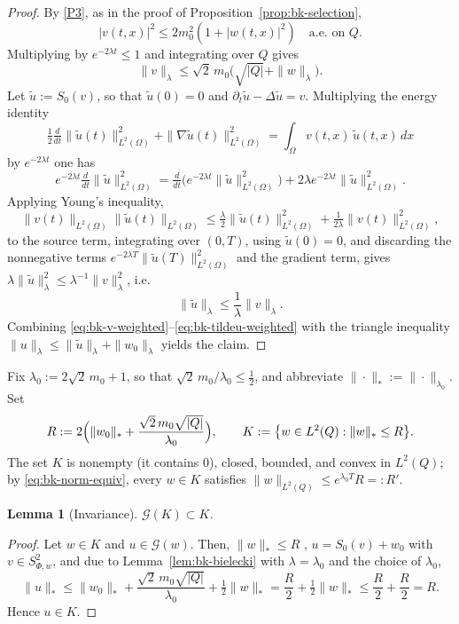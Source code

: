 \documentclass[11pt]{elsarticle}
\newtheorem{lemma}[theorem]{Lemma}
\theoremstyle{definition}
\theoremstyle{remark}
\numberwithin{equation}{section}
\begin{document}
\begin{proof}
	By \ref{P3}, as in the proof of
	Proposition~\ref{prop:bk-selection},
	\[
	|v(t,x)|^2\le2m_0^2(1+|w(t,x)|^2) \quad\text{a.e.\ on }Q.
	\]
	Multiplying by
	$e^{-2\lambda t}\le1$ and integrating over $Q$ gives
	\begin{equation}\label{eq:bk-v-weighted}
		\|v\|_\lambda\le\sqrt2\,m_0\bigl(\sqrt{|Q|}+\|w\|_\lambda\bigr).
	\end{equation}
	Let $\tilde u:=S_0(v)$, so that $\tilde u(0)=0$ and
	$\partial_t\tilde u-\Delta\tilde u=v$. Multiplying the energy
	identity
	\[
	\tfrac12\tfrac{d}{dt}\|\tilde u(t)\|_{L^2(\Omega)}^2
	+\|\nabla\tilde u(t)\|_{L^2(\Omega)}^2
	=\int_\Omega v(t,x)\,\tilde u(t,x)\,dx
	\]
	by $e^{-2\lambda t}$ one has
	\[
	e^{-2\lambda t}\tfrac{d}{dt}\|\tilde u\|_{L^2(\Omega)}^2
	=\tfrac{d}{dt}\bigl(e^{-2\lambda t}\|\tilde u\|_{L^2(\Omega)}^2\bigr)
	+2\lambda e^{-2\lambda t}\|\tilde u\|_{L^2(\Omega)}^2. 
	\]
	Applying Young's inequality,
	\[
	\|v(t)\|_{L^2(\Omega)}\|\tilde u(t)\|_{L^2(\Omega)}
	\le\tfrac{\lambda}{2}\|\tilde u(t)\|_{L^2(\Omega)}^2
	+\tfrac{1}{2\lambda}\|v(t)\|_{L^2(\Omega)}^2,
	\]
	to the source term, integrating over $(0,T)$, using $\tilde u(0)=0$,
	and discarding the nonnegative terms
	$e^{-2\lambda T}\|\tilde u(T)\|_{L^2(\Omega)}^2$ and the gradient
	term, gives $\lambda\|\tilde u\|_\lambda^2\le
	\lambda^{-1}\|v\|_\lambda^2$, i.e.
	\begin{equation}\label{eq:bk-tildeu-weighted}
		\|\tilde u\|_\lambda\le\frac{1}{\lambda}\|v\|_\lambda.
	\end{equation}
	Combining
	\eqref{eq:bk-v-weighted}--\eqref{eq:bk-tildeu-weighted} with the
	triangle inequality
	$\|u\|_\lambda\le\|\tilde u\|_\lambda+\|w_0\|_\lambda$ yields the
	claim.
\end{proof}

Fix $\lambda_0:=2\sqrt2\,m_0+1$, so that
$\sqrt2\,m_0/\lambda_0\le\tfrac12$, and abbreviate
$\|\cdot\|_\ast:=\|\cdot\|_{\lambda_0}$. Set
\[
R:=2\Bigl(\|w_0\|_\ast+\frac{\sqrt2\,m_0\sqrt{|Q|}}{\lambda_0}\Bigr),
\qquad
K:=\bigl\{w\in L^2(Q):\|w\|_\ast\le R\bigr\}.
\]
The set $K$ is nonempty (it contains $0$), closed, bounded, and convex
in $L^2(Q)$; by \eqref{eq:bk-norm-equiv}, every $w\in K$ satisfies
$\|w\|_{L^2(Q)}\le e^{\lambda_0 T}R=:R'$.

\begin{lemma}[Invariance]
	\label{lem:bk-self-map}
	$\mathcal{G}(K)\subset K$.
\end{lemma}

\begin{proof}
	Let $w\in K$ and $u\in\mathcal{G}(w)$. Then, $\|w\|_\ast\le R$
, $u=S_0(v)+w_0$ with $v\in S^2_{\Phi,w}$, and due to Lemma~\ref{lem:bk-bielecki} with $\lambda=\lambda_0$ and the choice
	of $\lambda_0$,
	\[
	\|u\|_\ast
	\le\|w_0\|_\ast+\frac{\sqrt2\,m_0\sqrt{|Q|}}{\lambda_0}
	+\tfrac12\|w\|_\ast
	=\frac{R}{2}+\tfrac12\|w\|_\ast
	\le\frac{R}{2}+\frac{R}{2}=R.
	\]
	Hence $u\in K$.
\end{proof}
\end{document}
